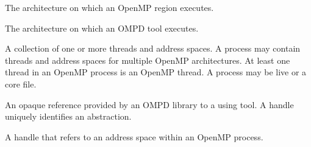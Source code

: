 \glossarydefstart
The architecture on which an OpenMP region executes.
\glossarydefend

\glossarydefstart
The architecture on which an OMPD tool executes.
\glossarydefend

\glossarydefstart
A collection of one or more threads and address spaces. A process may contain threads and address spaces for multiple OpenMP architectures.
At least one thread in an OpenMP process is an OpenMP thread.
A process may be live or a core file.
\glossarydefend

\glossarydefstart
An opaque reference provided by an OMPD library to a using tool. A handle uniquely identifies an abstraction.

\glossarydefend

\glossarydefstart
A handle that refers to an address space within an OpenMP process.
\glossarydefend

